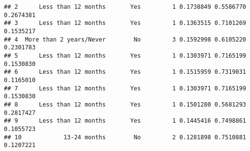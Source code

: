 \documentclass[]{article}
\begin{document}
\begin{verbatim}
## 2      Less than 12 months       Yes         1 0.1738849 0.5586770 0.2674381
## 3      Less than 12 months       Yes         1 0.1363515 0.7101269 0.1535217
## 4  More than 2 years/Never        No         3 0.1592998 0.6105220 0.2301783
## 5      Less than 12 months       Yes         1 0.1303971 0.7165199 0.1530830
## 6      Less than 12 months       Yes         1 0.1515959 0.7319031 0.1165010
## 7      Less than 12 months       Yes         1 0.1303971 0.7165199 0.1530830
## 8      Less than 12 months       Yes         1 0.1501280 0.5681293 0.2817427
## 9      Less than 12 months       Yes         1 0.1445416 0.7498861 0.1055723
## 10            13-24 months        No         2 0.1281898 0.7510881 0.1207221
\end{verbatim}
\end{document}

